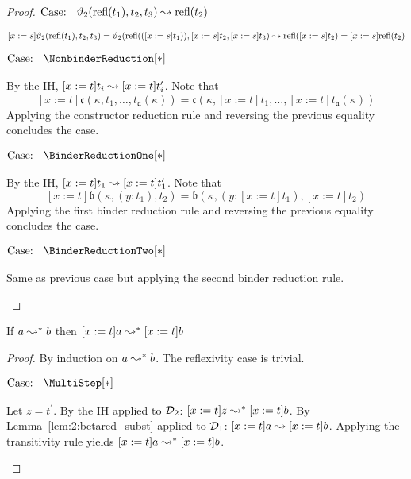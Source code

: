 \begin{proof}
    $\text{Case: }\begin{array}{c} \vartheta_2(\text{refl}(t_1), t_2, t_3) \leadsto \text{refl}(t_2) \end{array}$
    \begin{proofcase}
        $[x := s]\vartheta_2(\text{refl}(t_1), t_2, t_3) = \vartheta_2(\text{refl}(([x := s]t_1)), [x := s]t_2, [x := s]t_3) \leadsto \text{refl}([x := s]t_2) = [x := s]\text{refl}(t_2)$
    \end{proofcase}

    $\text{Case: }\begin{array}{c} \NonbinderReduction[*] \end{array}$
    \begin{proofcase}
        By the IH, $[x := t]t_i \leadsto [x := t]t_i^\prime$.
        Note that $$[x := t]\mathfrak{c}(\kappa, t_1, \ldots, t_{\mathfrak{a}}(\kappa)) = \mathfrak{c}(\kappa, [x := t]t_1, \ldots, [x := t]t_{\mathfrak{a}}(\kappa))$$
        Applying the constructor reduction rule and reversing the previous equality concludes the case.
    \end{proofcase}

    $\text{Case: }\begin{array}{c} \BinderReductionOne[*] \end{array}$
    \begin{proofcase}
        By the IH, $[x := t]t_1 \leadsto [x := t]t_1^\prime$.
        Note that $$[x := t]\mathfrak{b}(\kappa, (y : t_1), t_2) = \mathfrak{b}(\kappa, (y : [x := t]t_1), [x := t]t_2)$$
        Applying the first binder reduction rule and reversing the previous equality concludes the case.
    \end{proofcase}

    $\text{Case: }\begin{array}{c} \BinderReductionTwo[*] \end{array}$
    \begin{proofcase}
        Same as previous case but applying the second binder reduction rule.
    \end{proofcase}
\end{proof}

\begin{lemma}
    If $a \leadsto^* b$ then $[x := t]a \leadsto^* [x := t]b$
    \label{lem:2:betastar_subst_weak1}
\end{lemma}
\begin{proof}
    By induction on $a \leadsto^* b$.
    The reflexivity case is trivial.

    $\text{Case: }\begin{array}{c} \MultiStep[*] \end{array}$
    \begin{proofcase}
        Let $z = t^\prime$.
        By the IH applied to $\mathcal{D}_{2}$: $[x := t]z \leadsto^* [x := t]b$.
        By Lemma~\ref{lem:2:betared_subst} applied to $\mathcal{D}_{1}$: $[x := t]a \leadsto [x := t]b$.
        Applying the transitivity rule yields $[x := t]a \leadsto^* [x := t]b$.
    \end{proofcase}
\end{proof}

